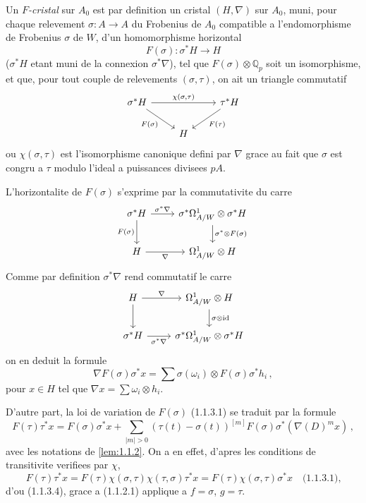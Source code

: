 \documentclass[12pt,a4paper]{article}
\theoremstyle{plain}
\theoremstyle{definition}
\theoremstyle{remark}
\DeclareMathOperator{\id}{id}
\begin{document}
Un \emph{$F$-cristal} sur $A_0$ est par definition un cristal $(H,\nabla)$ sur $A_0$, muni, pour chaque relevement $\sigma : A \to A$ du Frobenius de $A_0$ compatible a l'endomorphisme de Frobenius $\sigma$ de $W$, d'un homomorphisme horizontal
\[
F(\sigma) : \sigma^*H \longrightarrow H
\]
($\sigma^*H$ etant muni de la connexion $\sigma^*\nabla$), tel que $F(\sigma) \otimes \mathbb{Q}_p$ soit un isomorphisme, et que, pour tout couple de relevements $(\sigma, \tau)$, on ait un triangle commutatif
\begin{equation}\label{eq:1.1.3.1}
\begin{tikzcd}
\sigma^*H \arrow{rr}{\chi(\sigma,\tau)} \arrow{dr}[swap]{F(\sigma)} && \tau^*H \arrow{dl}{F(\tau)} \\
& H
\end{tikzcd}
\end{equation}
ou $\chi(\sigma,\tau)$ est l'isomorphisme canonique defini par $\nabla$ grace au fait que $\sigma$ est congru a $\tau$ modulo l'ideal a puissances divisees $pA$.

L'horizontalite de $F(\sigma)$ s'exprime par la commutativite du carre
\begin{equation}\label{eq:1.1.3.2}
\begin{tikzcd}
\sigma^*H \rar{\sigma^*\nabla} \dar[swap]{F(\sigma)} & \sigma^*\Omega^1_{A/W} \otimes \sigma^*H \dar{\sigma^* \otimes F(\sigma)} \\
H \rar[swap]{\nabla} & \Omega^1_{A/W} \otimes H
\end{tikzcd}
\end{equation}
Comme par definition $\sigma^*\nabla$ rend commutatif le carre
\[
\begin{tikzcd}
H \rar{\nabla} \dar & \Omega^1_{A/W} \otimes H \dar{\sigma \otimes \id} \\
\sigma^*H \rar[swap]{\sigma^*\nabla} & \sigma^*\Omega^1_{A/W} \otimes \sigma^*H
\end{tikzcd}
\]
on en deduit la formule
\begin{equation}\label{eq:1.1.3.3}
\nabla F(\sigma)\sigma^*x = \sum \sigma(\omega_i) \otimes F(\sigma)\sigma^*h_i\,,
\end{equation}
pour $x \in H$ tel que $\nabla x = \sum \omega_i \otimes h_i$.

D'autre part, la loi de variation de $F(\sigma)$ (1.1.3.1) se traduit par la formule
\begin{equation}\label{eq:1.1.3.4}
F(\tau)\tau^*x = F(\sigma)\sigma^*x + \sum_{|m|>0} (\tau(t)-\sigma(t))^{[m]} F(\sigma)\sigma^*(\nabla(D)^m x)\,,
\end{equation}
avec les notations de \ref{lem:1.1.2}. On a en effet, d'apres les conditions de transitivite verifiees par $\chi$,
\[
F(\tau)\tau^*x = F(\tau)\chi(\sigma,\tau)\chi(\tau,\sigma)\tau^*x = F(\tau)\chi(\sigma,\tau)\sigma^*x \quad \text{(1.1.3.1),}
\]
d'ou (1.1.3.4), grace a (1.1.2.1) applique a $f = \sigma$, $g = \tau$.
\end{document}
